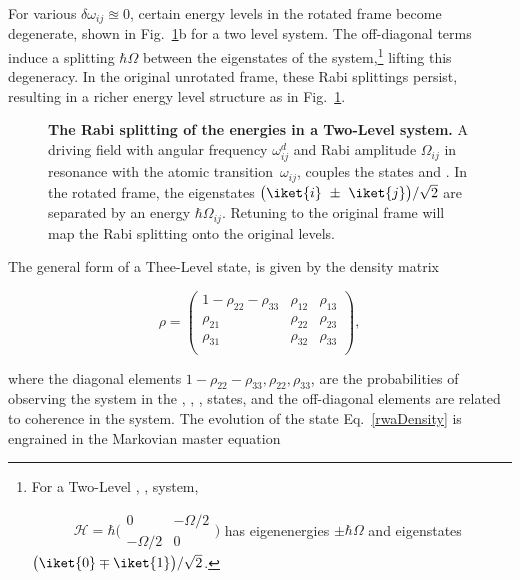   \noindent For various $ \delta\omega_{ij} \approxeq 0$, certain energy levels in the rotated frame become degenerate, shown in Fig.~\ref{theoRotation}b for a two level system. The off-diagonal terms induce a splitting $ \hbar\Omega $ between the eigenstates of the system,\footnote{For a Two-Level , , system,
  	
  	$\qquad\quad \mathcal{H} = \hbar\big(\begin{smallmatrix}0 & -\Omega/2\\-\Omega/2&0\end{smallmatrix}\big) $ has eigenenergies $ \pm\hbar\Omega $ and eigenstates $ \big(\iket{0}\mp\iket{1}\big)/\sqrt{2} $.} lifting this degeneracy. In the original unrotated frame, these Rabi splittings persist, resulting in a richer energy level structure as in Fig.~\ref{theoRotation}.
  
  \begin{figure}
  	\caption{\textbf{The Rabi splitting of the energies in a Two-Level system.} A driving field with angular frequency $ \omega_{ij}^{d} $ and Rabi amplitude $ \Omega_{ij} $ in resonance with the atomic transition~$ \omega_{ij} $, couples the states  and . In the rotated frame, the eigenstates $ \big(\iket{i}~\pm~\iket{j}\big)/\sqrt{2} $ are separated by an energy $ \hbar\Omega_{ij} $. Retuning to the original frame will map the Rabi splitting onto the original levels.}
  	\label{theoRotation}
  \end{figure}
  
  The general form of a Thee-Level state, is given by the density matrix \cite{quantumOptics}
  
  \begin{equation}
  \rho = \begin{pmatrix}
  1-\rho_{22}-\rho_{33} & \rho_{12} & \rho_{13}\\
  \rho_{21} & \rho_{22} & \rho_{23}\\
  \rho_{31} & \rho_{32} & \rho_{33}\\
  \end{pmatrix},
  \label{rwaDensity}
  \end{equation} 
  
  \noindent where the diagonal elements $ 1-\rho_{22}-\rho_{33}, \rho_{22}, \rho_{33} $, are the probabilities of observing the system in the , , , states, and the off-diagonal elements are related to coherence in the system.  The evolution of the state Eq.~\eqref{rwaDensity} is engrained in the Markovian master equation \cite{zoller}
  
